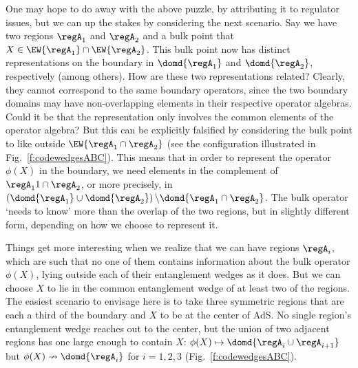 \documentclass[12pt,openany]{book}
\begin{document}
One may hope to do away with the above puzzle, by attributing it to regulator issues, but we can up the stakes by considering the next scenario. Say we have two regions $\regA_1$ and $\regA_2$ and a bulk point that $X \in \EW{\regA_1} \cap \EW{\regA_2}$. This bulk point now has distinct representations on the boundary in $\domd{\regA_1}$ and $\domd{\regA_2}$, respectively (among others). How are these two representations related? Clearly, they cannot correspond to the same boundary operators, since the two boundary domains may have non-overlapping elements in their respective operator algebras. Could it be that the representation only involves the common elements of the operator algebra? But this can be explicitly falsified by considering the bulk point to like outside $\EW{\regA_1\cap \regA_2}$ (see the configuration illustrated in Fig.~\ref{f:codewedgesABC}).  This means that in order to represent the
operator $\phi(X)$ in the boundary,  we need elements in the complement of $\regA_11\cap \regA_2$, or more precisely, in $\left(\domd{\regA_1} \cup \domd{\regA_2} \right)\backslash \domd{\regA_1 \cap \regA_2}$. The bulk operator `needs to know' more than the overlap of the two regions, but in slightly different form, depending on how we choose to represent it.

Things get more interesting when we realize that we can have regions $\regA_i$, which are such that no one of them contains information about the bulk operator $\phi(X)$,  lying outside each of their entanglement wedges as it does. But we can choose $X$ to lie in the common entanglement wedge of at least two of the regions. The easiest scenario to envisage here is to take three symmetric regions that are each a third of the boundary and $X$ to be at the center of AdS. No single region's entanglement wedge reaches out to the center, but the union of two adjacent regions has one large enough to contain $X$:  $\phi(X) \mapsto \domd{\regA_i \cup\regA_{i+1}}$ but $\phi(X) \nrightarrow \domd{\regA_i}$  for $i=1,2,3$ (Fig.~\ref{f:codewedgesABC}).
\end{document}
